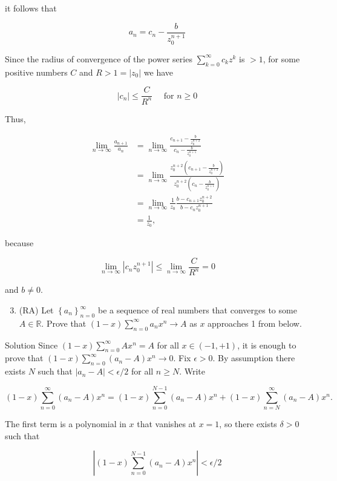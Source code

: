 \documentclass[10pt]{article}
\begin{document}
it follows that

$$
a_{n}=c_{n}-\frac{b}{z_{0}^{n+1}}
$$

Since the radius of convergence of the power series $\sum_{k=0}^{\infty} c_{k} z^{k}$ is $>1$, for some positive numbers $C$ and $R>1=\left|z_{0}\right|$ we have

$$
\left|c_{n}\right| \leq \frac{C}{R^{n}} \quad \text { for } n \geq 0
$$

Thus,

$$
\begin{aligned}
\lim _{n \rightarrow \infty} \frac{a_{n+1}}{a_{n}} & =\lim _{n \rightarrow \infty} \frac{c_{n+1}-\frac{b}{z_{0}^{n+2}}}{c_{n}-\frac{b}{z_{0}^{n+1}}} \\
& =\lim _{n \rightarrow \infty} \frac{z_{0}^{n+2}\left(c_{n+1}-\frac{b}{z_{0}^{n+2}}\right)}{z_{0}^{n+2}\left(c_{n}-\frac{b}{z_{0}^{n+1}}\right)} \\
& =\lim _{n \rightarrow \infty} \frac{1}{z_{0}} \frac{b-c_{n+1} z_{0}^{n+2}}{b-c_{n} z_{0}^{n+1}} \\
& =\frac{1}{z_{0}},
\end{aligned}
$$

because

$$
\lim _{n \rightarrow \infty}\left|c_{n} z_{0}^{n+1}\right| \leq \lim _{n \rightarrow \infty} \frac{C}{R^{n}}=0
$$

and $b \neq 0$.

\begin{enumerate}
  \setcounter{enumi}{2}
  \item (RA) Let $\left\{a_{n}\right\}_{n=0}^{\infty}$ be a sequence of real numbers that converges to some $A \in \mathbb{R}$. Prove that $(1-x) \sum_{n=0}^{\infty} a_{n} x^{n} \rightarrow A$ as $x$ approaches 1 from below.
\end{enumerate}

Solution Since $(1-x) \sum_{n=0}^{\infty} A x^{n}=A$ for all $x \in(-1,+1)$, it is enough to prove that $(1-x) \sum_{n=0}^{\infty}\left(a_{n}-A\right) x^{n} \rightarrow 0$. Fix $\epsilon>0$. By assumption there exists $N$ such that $\left|a_{n}-A\right|<\epsilon / 2$ for all $n \geq N$. Write

$$
(1-x) \sum_{n=0}^{\infty}\left(a_{n}-A\right) x^{n}=(1-x) \sum_{n=0}^{N-1}\left(a_{n}-A\right) x^{n}+(1-x) \sum_{n=N}^{\infty}\left(a_{n}-A\right) x^{n} .
$$

The first term is a polynomial in $x$ that vanishes at $x=1$, so there exists $\delta>0$ such that

$$
\left|(1-x) \sum_{n=0}^{N-1}\left(a_{n}-A\right) x^{n}\right|<\epsilon / 2
$$
\end{document}
